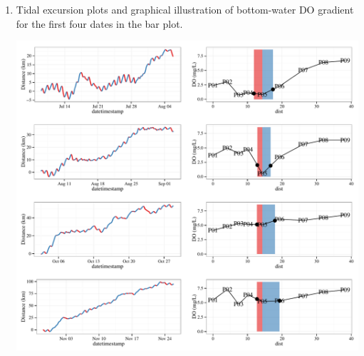 \documentclass[letterpaper,12pt]{article}\usepackage[]{graphicx}\usepackage[]{color}
\begin{document}
\begin{enumerate}
{{}



}
\item{
Tidal excursion plots and graphical illustration of bottom-water DO gradient for the first four dates in the bar plot. 


{\centering \includegraphics[width=\textwidth]{figs/unnamed-chunk-8-1} 

}




}
\end{enumerate}
\end{document}
